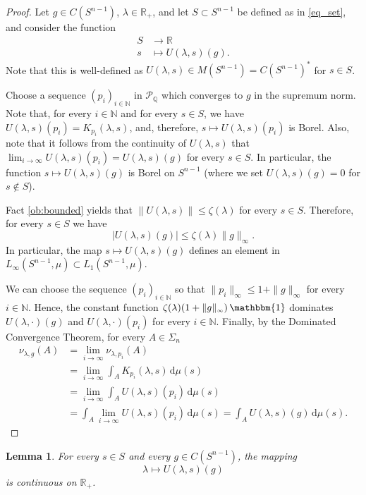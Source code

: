 \documentclass[11pt, a4paper]{amsart}
\newtheorem{lemma}[proposition]{Lemma}
\renewcommand{\d}{\,\mathrm{d}}
\newcommand{\uno}{\operatorname{\mathbbm{1}}}
\newcommand{\cm}{\zeta}
\newcommand{\rp}{\mathbb R_{\scriptscriptstyle +}}
\newcommand{\sn}{{S^{n-1}}}
\renewcommand{\d}{\,\mathrm{d}}
\newcommand{\R}{\mathbb R}
\newcommand{\poly}{\mathcal P_{\mathbb Q}}
\begin{document}
\begin{proof}
Let $g\in  C(\sn )$, $\lambda\in\rp$, and let $S\subset \sn $ be defined as in \eqref{eq_set}, and consider the function 
\begin{align*}   
S & \longrightarrow  \R  \\
s &  \longmapsto  U(\lambda, s)(g).    
\end{align*} 
Note that this is well-defined as $U(\lambda,s)\in M(\sn )=C(\sn )^*$ for $s\in S$.

Choose a sequence $(p_i)_{i\in\mathbb N}$ in $\poly$ which converges to $g$ in the supremum norm. Note that, for every $i\in \mathbb N$ and for every $s\in S$, we have $U(\lambda, s)(p_i) = K_{p_i}(\lambda, s)$, and, therefore, $s\mapsto U(\lambda, s)(p_i)$ is Borel. 
Also, note that it follows from the continuity of $U(\lambda,s)$ that $\lim_{i\to\infty} U(\lambda,s)(p_i) = U(\lambda,s)(g)$ for every $s \in S$. 
In particular, the function  $ s  \mapsto  U(\lambda,s)(g)$ is Borel on $\sn$ (where we set $U(\lambda, s)(g)=0$ for $s\notin S$). 

\goodbreak
Fact \ref{ob:bounded} yields that $\|U(\lambda, s)\|\leq \cm(\lambda)$ for every $s\in S$. Therefore, for every $s\in S$ we have
\[\vert U(\lambda,s)(g)\vert \leq \cm(\lambda) \|g\|_{\scriptscriptstyle \infty}.\] 
In particular, the map $ s  \mapsto U(\lambda, s)(g)$ defines an element in $L_{\scriptscriptstyle \infty}(\sn,\mu)\subset L_1(\sn,\mu)$. 

We can choose the sequence $(p_i)_{i\in\mathbb N}$ so that $\|p_i\|_{\scriptscriptstyle \infty}\leq 1+\|g\|_{\scriptscriptstyle \infty}$ for every $i\in \mathbb N$. Hence, the constant function $\cm(\lambda)(1+\|g\|_{\scriptscriptstyle \infty}) \uno$ dominates $ U(\lambda,\cdot)(g)$ and $U(\lambda,\cdot)(p_i)$ for every $i\in \mathbb N$. Finally, by the Dominated Convergence Theorem, for every $A\in\Sigma_n$
\begin{align*}
    \nu_{\lambda,g}(A) & = \lim_{i\to\infty} \nu_{\lambda,p_i}(A)\\
    &= \lim_{i\to\infty} \int_{A}K_{p_i}(\lambda,s) \d\mu(s)\\
    &=\lim_{i\to\infty} \int_{ A} U(\lambda,s)(p_i) \d\mu(s)\\ 
        & = \int_{ A} \lim_{i\to\infty} U(\lambda,s)(p_i) \d\mu(s) =\int_{ A}  U(\lambda,s)(g)\d\mu(s).
\end{align*}
\end{proof}

\begin{lemma}\label{l:Uwcont}
For every $s\in S$ and every $g\in C(\sn)$, the mapping
\[
    \lambda\mapsto U(\lambda,s)(g)
\]
is continuous on $\mathbb{R}_{\scriptscriptstyle +}$.
\end{lemma}
\end{document}
